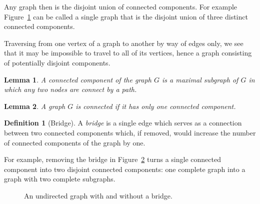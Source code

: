 \documentclass{amsart}
\theoremstyle{plain}
\newtheorem*{lemma*}{Lemma}
\theoremstyle{remark}
\theoremstyle{definition}
\newtheorem*{definition*}{Definition}
\newenvironment{definition}%
  {\begin{leftbar}\begin{definition*}
}{%
  \end{definition*}\end{leftbar}
}
\begin{document}
Any graph then is the disjoint union of connected components.
For example Figure~\ref{fig:disjoint-union} can be called a single graph that is the disjoint
union of three distinct connected components.
\begin{figure}[ht]
  \caption[Disjoin union]{}\label{fig:disjoint-union}
\end{figure}
Traversing from one vertex of a graph to another by way of edges only, we see
that it may be impossible to travel to all of its vertices, hence a graph
consisting of potentially disjoint components.
\begin{lemma*}
  A connected component of the graph $G$ is a maximal subgraph of $G$ in which
  any two nodes are connect by a path.
\end{lemma*}
\begin{lemma*}
  A graph $G$ is \emph{connected} if it has only one connected component.
\end{lemma*}
\begin{definition}[Bridge]
  A \emph{bridge} is a single edge which serves as a connection between two connected
  components which, if removed, would increase the number of connected
  components of the graph by one.
\end{definition}

For example, removing the bridge in Figure~\ref{fig:bridge} turns a single
connected component into two disjoint connected components:
one complete graph into a graph with two complete subgraphs.
\begin{figure}[ht]
  \hspace{1in}
  \caption[Bridges]{An undirected graph
  with and without a bridge.}\label{fig:bridge}
\end{figure}
\end{document}

